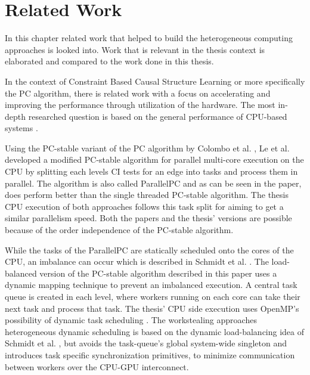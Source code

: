 \chapter{Related Work}
\label{chap:relwork}
In this chapter related work that helped to build the heterogeneous computing approaches is looked into. Work that is relevant in the thesis context is elaborated and compared to the work done in this thesis.

In the context of Constraint Based Causal Structure Learning or more specifically the PC algorithm, there is related work with a focus on accelerating and improving the performance through utilization of the hardware. The most in-depth researched question is based on the general performance of CPU-based systems \cite{leFastPCAlgorithm2019, leParallelPCPackageEfficient2018, schmidtLoadBalancedParallelConstraintBased2019, colomboOrderIndependentConstraintBasedCausal,kalischEstimatingHighDimensionalDirected2007,scutariBayesianNetworkConstraintBased2017, madsenParallelAlgorithmBayesian2017,madsenParallelisationPCAlgorithm2015,nguyenMrPCCausalStructure2020}. 

Using the PC-stable variant of the PC algorithm by Colombo et al. \cite{colomboOrderIndependentConstraintBasedCausal}, Le et al. \cite{leFastPCAlgorithm2019, leParallelPCPackageEfficient2018} developed a modified PC-stable algorithm for parallel multi-core execution on the CPU by splitting each levels CI tests for an edge into tasks and process them in parallel. The algorithm is also called ParallelPC and as can be seen in the paper, does perform better than the single threaded PC-stable algorithm. The thesis CPU execution of both approaches follows this task split for aiming to get a similar parallelism speed. Both the papers and the thesis' versions are possible because of the order independence of the PC-stable algorithm.

While the tasks of the ParallelPC are statically scheduled onto the cores of the CPU, an imbalance can occur which is described in Schmidt et al. \cite{schmidtLoadBalancedParallelConstraintBased2019}. The load-balanced version of the PC-stable algorithm described in this paper uses a dynamic mapping technique to prevent an imbalanced execution. A central task queue is created in each level, where workers running on each core can take their next task and process that task. The thesis' CPU side execution uses OpenMP's possibility of dynamic task scheduling \cite{breshearsArtConcurrencyThread2009}. The workstealing approaches heterogeneous dynamic scheduling is based on the dynamic load-balancing idea of Schmidt et al. \cite{schmidtLoadBalancedParallelConstraintBased2019}, but avoids the task-queue's global system-wide singleton and introduces task specific synchronization primitives, to minimize communication between workers over the CPU-GPU interconnect.

